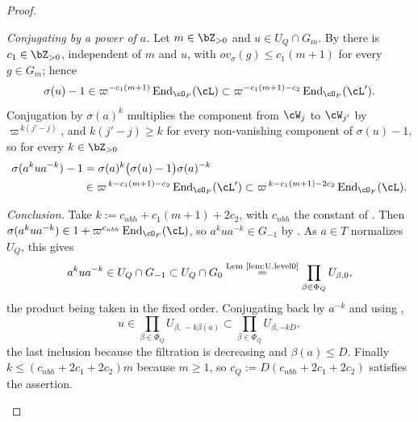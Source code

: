 \documentclass[12pt,a4paper]{amsart}%
\newcommand{\RamiF}[1]{{{#1}}}
\begin{document}
\begin{proof}
\begin{itemize}
\emph{Conjugating by a power of $a$.} Let $m\in\Z_{>0}$ and $u\in U_Q\cap G_m$. By
 there is $c_1\in\Z_{>0}$, independent of $m$ and $u$, with
$ov_\sigma(g)\leq c_1(m+1)$ for every $g\in G_m$; hence
$$
\sigma(u)-1\in\varpi^{-c_1(m+1)}\End_{\cO_F}(\cL)\subset\varpi^{-c_1(m+1)-c_2}\End_{\cO_F}(\cL') .
$$
Conjugation by $\sigma(a)^k$ multiplies the component from $\cW_j$ to $\cW_{j'}$ by
$\varpi^{\,k(j'-j)}$, and $k(j'-j)\geq k$ for every non-vanishing component of $\sigma(u)-1$, so
for every $k\in\Z_{>0}$
\begin{align*}
\sigma(a^kua^{-k})-1&=\sigma(a)^k\bigl(\sigma(u)-1\bigr)\sigma(a)^{-k}\\
&\in\varpi^{\,k-c_1(m+1)-c_2}\End_{\cO_F}(\cL')
\subset\varpi^{\,k-c_1(m+1)-2c_2}\End_{\cO_F}(\cL).
\end{align*}

\emph{Conclusion.} Take $k:=c_{nbh}+c_1(m+1)+2c_2$, with $c_{nbh}$ the constant of
. Then $\sigma(a^kua^{-k})\in1+\varpi^{c_{nbh}}\End_{\cO_F}(\cL)$, so
$a^kua^{-k}\in G_{-1}$ by . As $a\in T$ normalizes $U_Q$, this gives
$$
\RamiF{a^kua^{-k}\in U_Q\cap G_{-1}\subset U_Q\cap G_{0}
\overset{\text{Lem \ref{lem:U.level0}}}{=}\prod_{\beta\in\Phi_Q}U_{\beta,0}},
$$
the product being taken in the fixed order. Conjugating back by $a^{-k}$ and using
,
$$
\RamiF{u\in\prod_{\beta\in\Phi_Q}U_{\beta,\,-k\beta(a)}\subset\prod_{\beta\in\Phi_Q}U_{\beta,-kD}},
$$
the last inclusion because the filtration is decreasing and $\beta(a)\leq D$. Finally
$k\leq(c_{nbh}+2c_1+2c_2)m$ because $m\geq1$, so
$c_Q:=D(c_{nbh}+2c_1+2c_2)$ satisfies the assertion.
\end{itemize}
\end{proof}
\end{document}
